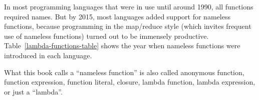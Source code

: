In most programming languages that were in use until around 1990,
all functions required names. But by 2015, most languages added support
for nameless functions, because programming in the map/reduce style
(which invites frequent use of nameless functions) turned out to be
immensely productive. Table\ \ref{lambda-functions-table} shows
the year when nameless functions were introduced in each language.

What this book calls a \textsf{``}nameless function\textsf{''} is also called anonymous
function, function
expression, function literal, closure, lambda
function, lambda expression, or just a \textsf{``}lambda\textsf{''}.
